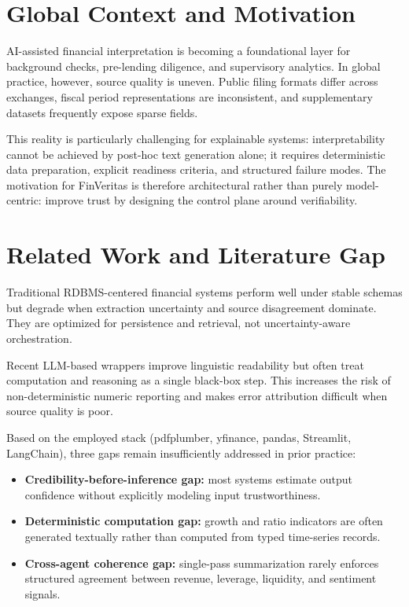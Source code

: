 \documentclass[conference]{IEEEtran}
\begin{document}
\section{Global Context and Motivation}
AI-assisted financial interpretation is becoming a foundational layer for background checks, pre-lending diligence, and supervisory analytics. In global practice, however, source quality is uneven. Public filing formats differ across exchanges, fiscal period representations are inconsistent, and supplementary datasets frequently expose sparse fields.

This reality is particularly challenging for explainable systems: interpretability cannot be achieved by post-hoc text generation alone; it requires deterministic data preparation, explicit readiness criteria, and structured failure modes. The motivation for FinVeritas is therefore architectural rather than purely model-centric: improve trust by designing the control plane around verifiability.

\section{Related Work and Literature Gap}
Traditional RDBMS-centered financial systems perform well under stable schemas but degrade when extraction uncertainty and source disagreement dominate. They are optimized for persistence and retrieval, not uncertainty-aware orchestration.

Recent LLM-based wrappers improve linguistic readability but often treat computation and reasoning as a single black-box step. This increases the risk of non-deterministic numeric reporting and makes error attribution difficult when source quality is poor.

Based on the employed stack (pdfplumber, yfinance, pandas, Streamlit, LangChain), three gaps remain insufficiently addressed in prior practice:
\begin{itemize}
    \item \textbf{Credibility-before-inference gap:} most systems estimate output confidence without explicitly modeling input trustworthiness.
    \item \textbf{Deterministic computation gap:} growth and ratio indicators are often generated textually rather than computed from typed time-series records.
    \item \textbf{Cross-agent coherence gap:} single-pass summarization rarely enforces structured agreement between revenue, leverage, liquidity, and sentiment signals.
\end{itemize}
\end{document}
